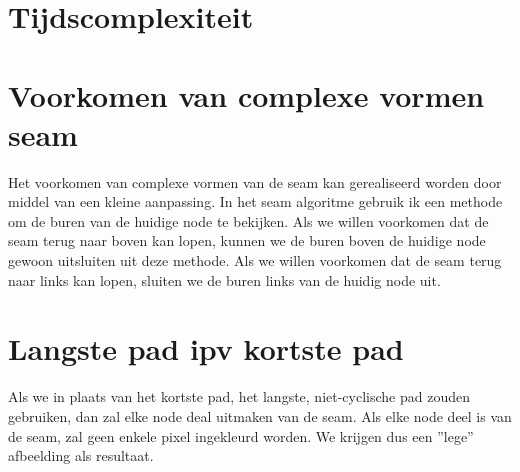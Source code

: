 \documentclass[11pt, a4paper]{article}
\begin{document}
\newpage
\section*{Tijdscomplexiteit}
\section*{Voorkomen van complexe vormen seam}
Het voorkomen van complexe vormen van de seam kan gerealiseerd worden door middel van een kleine aanpassing. In het seam algoritme gebruik ik een methode om de buren van de huidige node te bekijken. Als we willen voorkomen dat de seam terug naar boven kan lopen, kunnen we de buren boven de huidige node gewoon uitsluiten uit deze methode. Als we willen voorkomen dat de seam terug naar links kan lopen, sluiten we de buren links van de huidig node uit.
\section*{Langste pad ipv kortste pad}
Als we in plaats van het kortste pad, het langste, niet-cyclische pad zouden gebruiken, dan zal elke node deal uitmaken van de seam. Als elke node deel is van de seam, zal geen enkele pixel ingekleurd worden. We krijgen dus een ''lege'' afbeelding als resultaat.

\newpage
\end{document}

